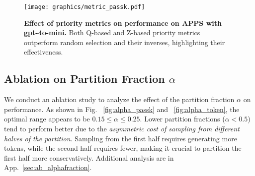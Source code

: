 \begin{figure}[ht]
    \centering
    \vspace{-0.2cm}\texttt{[image: graphics/metric\_passk.pdf]}
    \vspace{-0.3cm}
    \caption{\textbf{Effect of priority metrics on \decomp performance on APPS with gpt-4o-mini.} Both Q-based and Z-based priority metrics outperform random selection and their inverses, highlighting their effectiveness.}
    \label{fig:metric_passk}
\end{figure}



\subsection{Ablation on Partition Fraction $\alpha$}

We conduct an ablation study to analyze the effect of the partition fraction $\alpha$ on \decomp performance. As shown in Fig. ~\ref{fig:alpha_passk} and ~\ref{fig:alpha_token}, the optimal range appears to be $0.15 \leq \alpha \leq 0.25$. Lower partition fractions ($\alpha < 0.5$) tend to perform better due to the \emph{asymmetric cost of sampling from different halves of the partition}. Sampling from the first half requires generating more tokens, while the second half requires fewer, making it crucial to partition the first half more conservatively. Additional analysis are in App.~\ref{sec:ab_alphafraction}.

